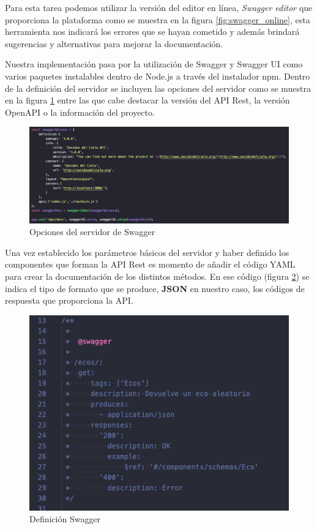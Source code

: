 Para esta tarea podemos utilizar la versión del editor en línea, \textit{Swagger editor} que proporciona la plataforma como se muestra en la figura \ref{fig:swagger_online}, esta herramienta nos indicará los errores que se hayan cometido y además brindará sugerencias y alternativas para mejorar la documentación.

Nuestra implementación pasa por la utilización de Swagger y Swagger UI como varios paquetes instalables dentro de Node.js \cite{DocumentWithSwagger} a través del instalador npm. Dentro de la definición del servidor se incluyen las opciones del servidor como se muestra en la figura \ref{fig:swagger_options} entre las que cabe destacar la versión del API Rest, la versión OpenAPI o la información del proyecto.

\begin{figure}[H]
    \centering
    \includegraphics[width=\textwidth]{include/capturas/SwaggerOptions.png}
    \caption{Opciones del servidor de Swagger}
    \label{fig:swagger_options}
\end{figure}

Una vez establecido los parámetros básicos del servidor y haber definido los componentes que forman la API Rest es momento de añadir el código YAML \cite{AutomaticAPIDocumentation} para crear la documentación de los distintos métodos. En ese código (figura \ref{fig:swagger_definition}) se indica el tipo de formato que se produce, \textbf{JSON} en nuestro caso, los códigos de respuesta que proporciona la API.

\begin{figure}[h]
    \centering
    \includegraphics[scale=0.7]{include/capturas/SwaggerYAML.png}
    \caption{Definición Swagger}
    \label{fig:swagger_definition}
\end{figure}

